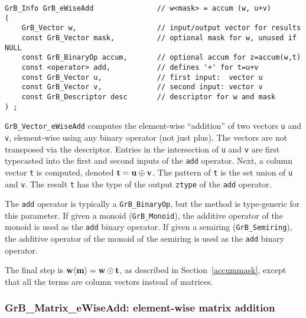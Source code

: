 \documentclass[12pt]{article}
\begin{document}
\begin{mdframed}[userdefinedwidth=6in]
{\footnotesize
\begin{verbatim}
GrB_Info GrB_eWiseAdd               // w<mask> = accum (w, u+v)
(
    GrB_Vector w,                   // input/output vector for results
    const GrB_Vector mask,          // optional mask for w, unused if NULL
    const GrB_BinaryOp accum,       // optional accum for z=accum(w,t)
    const <operator> add,           // defines '+' for t=u+v
    const GrB_Vector u,             // first input:  vector u
    const GrB_Vector v,             // second input: vector v
    const GrB_Descriptor desc       // descriptor for w and mask
) ;
\end{verbatim} } \end{mdframed}

\verb'GrB_Vector_eWiseAdd' computes the element-wise ``addition'' of two
vectors \verb'u' and \verb'v', element-wise using any binary operator (not just
plus).  The vectors are not transposed via the descriptor.  Entries in the
intersection of \verb'u' and \verb'v' are first typecasted into the first and
second inputs of the \verb'add' operator.  Next, a column vector \verb't' is
computed, denoted ${\bf t = u \oplus v}$.  The pattern of \verb't' is the set
union of \verb'u' and \verb'v'.  The result \verb't' has the type of the output
\verb'ztype' of the \verb'add' operator.

The \verb'add' operator is typically a \verb'GrB_BinaryOp', but the method is
type-generic for this parameter.  If given a monoid (\verb'GrB_Monoid'), the
additive operator of the monoid is used as the \verb'add' binary operator.  If
given a semiring (\verb'GrB_Semiring'), the additive operator of the monoid of
the semiring is used as the \verb'add' binary operator.

The final step is ${\bf w \langle m \rangle  = w \odot t}$, as described in
Section~\ref{accummask}, except that all the terms are column vectors instead
of matrices.

\subsubsection{{\sf GrB\_Matrix\_eWiseAdd:} element-wise matrix addition}
\label{eWiseAdd_matrix}
\end{document}
